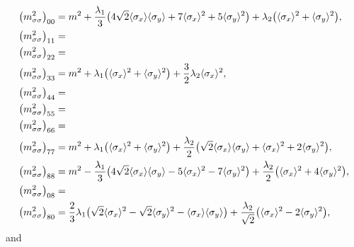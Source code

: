 \begin{equation}
\begin{split}
	\big(m^2_{\sigma\sigma}\big)_{00} &= m^2 + \frac{\lambda_1}{3} \big(4 \sqrt{2} \avg{\sigma_x} \avg{\sigma_y} + 7 \avg{\sigma_x}^2 + 5 \avg{\sigma_y}^2\big) + \lambda_2 \big(\avg{\sigma_x}^2 + \avg{\sigma_y}^2\big), \\
	\big(m^2_{\sigma\sigma}\big)_{11} &= \\
	\big(m^2_{\sigma\sigma}\big)_{22} &= \\
	\big(m^2_{\sigma\sigma}\big)_{33} &= m^2 + \lambda_1 \big(\avg{\sigma_x}^2 + \avg{\sigma_y}^2\big)                                              + \frac32 \lambda_2 \avg{\sigma_x}^2, \\
	\big(m^2_{\sigma\sigma}\big)_{44} &= \\
	\big(m^2_{\sigma\sigma}\big)_{55} &= \\
	\big(m^2_{\sigma\sigma}\big)_{66} &= \\
	\big(m^2_{\sigma\sigma}\big)_{77} &= m^2 + \lambda_1 \big(\avg{\sigma_x}^2 + \avg{\sigma_y}^2\big) + \frac{\lambda_2}{2} \big(\sqrt{2} \avg{\sigma_x} \avg{\sigma_y} + \avg{\sigma_x}^2 + 2 \avg{\sigma_y}^2\big), \\
	\big(m^2_{\sigma\sigma}\big)_{88} &= m^2 - \frac{\lambda_1}{3} \big(4 \sqrt{2} \avg{\sigma_x} \avg{\sigma_y} - 5 \avg{\sigma_x}^2 - 7 \avg{\sigma_y}^2\big) + \frac{\lambda_2}{2} \big(\avg{\sigma_x}^2 + 4 \avg{\sigma_y}^2\big), \\
	\big(m^2_{\sigma\sigma}\big)_{08} &= \\
	\big(m^2_{\sigma\sigma}\big)_{80} &= \frac23 \lambda_1 \big(\sqrt{2} \avg{\sigma_x}^2 - \sqrt{2} \avg{\sigma_y}^2 - \avg{\sigma_x} \avg{\sigma_y}\big) + \frac{\lambda_2}{\sqrt{2}} \big(\avg{\sigma_x}^2 - 2 \avg{\sigma_y}^2\big),
\end{split}%
\label{eq:lsm3f:mass_sigma_sigma}
\end{equation}%
and
